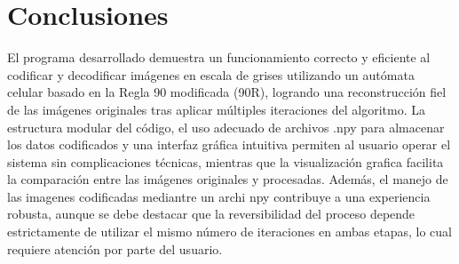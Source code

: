 \chapter{Conclusiones}
El programa desarrollado demuestra un funcionamiento correcto y eficiente al codificar y decodificar imágenes en escala de grises utilizando un autómata celular basado en la Regla 90 modificada (90R), logrando una reconstrucción fiel de las imágenes originales tras aplicar múltiples iteraciones del algoritmo. La estructura modular del código, el uso adecuado de archivos .npy para almacenar los datos codificados y una interfaz gráfica intuitiva permiten al usuario operar el sistema sin complicaciones técnicas, mientras que la visualización grafica facilita la comparación entre las imágenes originales y procesadas. Además, el manejo de las imagenes codificadas mediantre un archi npy contribuye a una experiencia robusta, aunque se debe destacar que la reversibilidad del proceso depende estrictamente de utilizar el mismo número de iteraciones en ambas etapas, lo cual requiere atención por parte del usuario.
